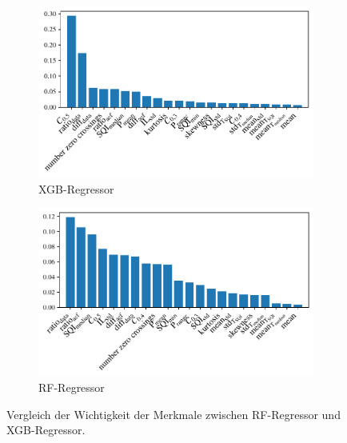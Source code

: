  \begin{figure}[h]
 	\centering
		\begin{subfigure}{.49\textwidth}
			\centering
 			\includegraphics[width=\textwidth]{pic/xgb-regr-final-importances.pdf}
 			\caption{\ac{XGB}-Regressor}
 		\end{subfigure}
    	\begin{subfigure}{.49\textwidth}
    		\centering
 			\includegraphics[width=\textwidth]{pic/rf-regr-final-importances.pdf}
 			\caption{\ac{RF}-Regressor}
 		\end{subfigure}
 	\caption{Vergleich der Wichtigkeit der Merkmale zwischen \ac{RF}-Regressor und \ac{XGB}-Regressor.}
 	\label{fig:importances-comparison-rf-xgb-regr}
 \end{figure}
 
